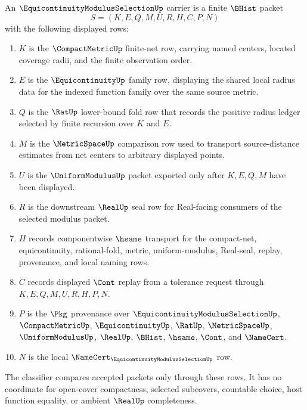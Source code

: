 \begin{definition}
\label{def:equicontinuity-modulus-selection-carrier}
An $\EquicontinuityModulusSelectionUp$ carrier is a finite $\BHist$ packet
$$
S=(K,E,Q,M,U,R,H,C,P,N)
$$
with the following displayed rows:
\begin{enumerate}
\item $K$ is the $\CompactMetricUp$ finite-net row, carrying named centers, located coverage radii, and the finite observation order.
\item $E$ is the $\EquicontinuityUp$ family row, displaying the shared local radius data for the indexed function family over the same source metric.
\item $Q$ is the $\RatUp$ lower-bound fold row that records the positive radius ledger selected by finite recursion over $K$ and $E$.
\item $M$ is the $\MetricSpaceUp$ comparison row used to transport source-distance estimates from net centers to arbitrary displayed points.
\item $U$ is the $\UniformModulusUp$ packet exported only after $K,E,Q,M$ have been displayed.
\item $R$ is the downstream $\RealUp$ seal row for Real-facing consumers of the selected modulus packet.
\item $H$ records componentwise $\hsame$ transport for the compact-net, equicontinuity, rational-fold, metric, uniform-modulus, Real-seal, replay, provenance, and local naming rows.
\item $C$ records displayed $\Cont$ replay from a tolerance request through $K,E,Q,M,U,R,H,P,N$.
\item $P$ is the $\Pkg$ provenance over $\EquicontinuityModulusSelectionUp$, $\CompactMetricUp$, $\EquicontinuityUp$, $\RatUp$, $\MetricSpaceUp$, $\UniformModulusUp$, $\RealUp$, $\BHist$, $\hsame$, $\Cont$, and $\NameCert$.
\item $N$ is the local $\NameCert_{\EquicontinuityModulusSelectionUp}$ row.
\end{enumerate}
The classifier compares accepted packets only through these rows. It has no coordinate for open-cover compactness, selected subcovers, countable choice, host function equality, or ambient $\RealUp$ completeness.
\end{definition}

